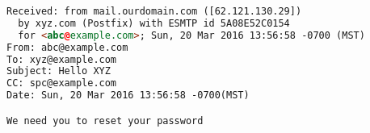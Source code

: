 \begin{lstlisting}[language=HTML,caption={SMTP headers generated by a PHP mailing
  script.},label={code:smtpheaders}, float]
Received: from mail.ourdomain.com ([62.121.130.29])
  by xyz.com (Postfix) with ESMTP id 5A08E52C0154
  for <abc@example.com>; Sun, 20 Mar 2016 13:56:58 -0700 (MST)
From: abc@example.com
To: xyz@example.com
Subject: Hello XYZ
CC: spc@example.com
Date: Sun, 20 Mar 2016 13:56:58 -0700(MST)

We need you to reset your password
\end{lstlisting}
